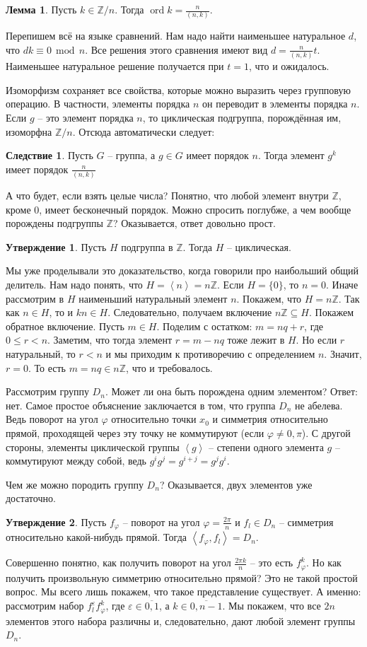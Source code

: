 \documentclass[10pt,a4paper,oneside]{book}
\theoremstyle{definition}
\newtheorem{lem}{\color{green!50!black}Лемма}
\newtheorem{cor}{\color{green!45!black}Следствие}
\newtheorem{utvr}{\color{blue!50!black}Утверждение}
\renewcommand{\leq}{\leqslant}
\renewcommand{\mod}{\,\operatorname{mod}\,}
\newcommand{\mb}[1]{\mathbb{#1}}
\newcommand{\ovl}{\overline}
\newcommand{\ord}{\operatorname{ord}}
\def\ffi{\varphi}
\def\eps{\varepsilon}
\def\lan{\left\langle }
\def\ran{\right\rangle}
\def\lm{\begin{lem}}
\def\elm{\end{lem}}
\def\crl{\begin{cor}}
\def\ecrl{\end{cor}}
\def\utv{\begin{utvr}}
\def\eutv{\end{utvr}}
\begin{document}
\lm Пусть $k\in \mb Z/n$. Тогда $\ord k = \frac{n}{(n,k)}$. 
\elm
\proof Перепишем всё на языке сравнений. Нам надо найти наименьшее натуральное $d$, что $dk\equiv 0 \mod n$. Все решения этого сравнения имеют вид $d=\frac{n}{(n,k)}t$. Наименьшее натуральное решение получается при $t=1$, что и ожидалось.
\endproof

Изоморфизм сохраняет все свойства, которые можно выразить через групповую операцию. В частности, элементы порядка $n$ он переводит в элементы порядка $n$. Если $g$ -- это элемент порядка $n$, то циклическая подгруппа, порождённая им, изоморфна $\mb Z/n$. Отсюда автоматически следует: 

\crl Пусть $G$ -- группа, а $g\in G$ имеет порядок $n$. Тогда элемент $g^k$ имеет порядок $\frac{n}{(n,k)}$ 
\ecrl

А что будет, если взять целые числа? Понятно, что любой элемент внутри $\mb Z$, кроме $0$, имеет бесконечный порядок. Можно спросить поглубже, а чем вообще порождены подгруппы $\mb Z$? Оказывается, ответ довольно прост.

\utv Пусть $H$ подгруппа в $\mb Z$. Тогда $H$ -- циклическая.
\eutv
\proof Мы уже проделывали это доказательство, когда говорили про наибольший общий делитель. Нам надо понять, что $H=\lan n\ran =n\mb Z$. Если $H=\{0\}$, то $n=0$. Иначе рассмотрим в $H$ наименьший натуральный элемент $n$. Покажем, что $H=n\mb Z$. Так как $n \in H$, то и $kn \in H$. Следовательно, получаем включение $n\mb Z \subseteq H$. Покажем обратное включение. Пусть $m\in H$. Поделим с остатком: $m=nq+r$, где $0\leq r<n$. Заметим, что тогда элемент $r=m-nq$ тоже лежит в $H$. Но если $r$ натуральный, то $r<n$ и мы приходим к противоречию с определением $n$. Значит,  $r=0$. То есть $m=nq \in n \mb Z$, что и требовалось. 
\endproof

Рассмотрим группу $D_n$. Может ли она быть порождена одним элементом? Ответ: нет. Самое простое объяснение заключается в том, что группа $D_n$ не абелева. Ведь поворот на угол $\ffi$ относительно точки $x_0$ и симметрия относительно прямой, проходящей через эту точку не коммутируют (если $\ffi \neq 0, \pi $). С другой стороны, элементы циклической группы $\lan g\ran$ -- степени одного элемента $g$ -- коммутируют между собой, ведь $g^ig^j=g^{i+j}=g^jg^i$.

Чем же можно породить группу $D_n$? Оказывается, двух элементов уже достаточно.

\utv Пусть $f_{\ffi}$ -- поворот на угол   $\ffi=\frac{2\pi}{n}$ и $f_l \in D_n$ -- симметрия относительно какой-нибудь прямой.
Тогда $\lan f_{\ffi},f_l\ran =D_n$.
\eutv
\proof
Совершенно понятно, как получить поворот на угол $\frac{2\pi k}n$ -- это есть $f_{\ffi}^k$. Но как получить произвольную симметрию относительно прямой? Это не такой простой вопрос. Мы всего лишь покажем, что такое представление существует. А именно: рассмотрим набор $f_l^{\eps} f_{\ffi}^k$, где $\eps\in \ovl{0,1}$, а $k\in \ovl{0,n-1}$.  Мы покажем, что все $2n$ элементов этого набора различны и, следовательно, дают любой элемент группы $D_n$. 
\end{document}
